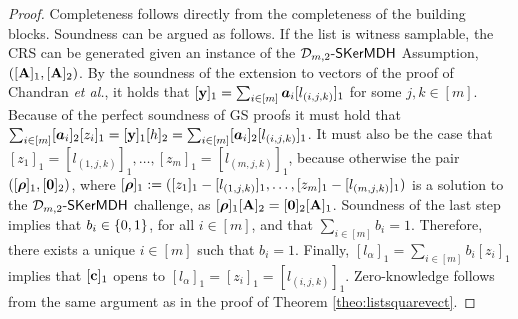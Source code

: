 \begin{proof} Completeness follows directly from the completeness of the 
building blocks.  Soundness can be argued as follows. If the list is witness samplable, the CRS can be generated given an instance of the $\mathcal{D}_{m,2}\mbox{-}\mathsf{SKerMDH}$ Assumption, $([\mathbf{{A}}]_1, [\mathbf{{A}}]_2)$. By the soundness of the extension to vectors of the proof of Chandran \textit{et al.}, it holds that $[\mathbf{y}]_1 = \sum_{i\in[m]}{\boldsymbol a}_i[l_{(i,j,k)}]_1$ for some $j,k\in[m]$.
Because of the perfect soundness of GS proofs it must hold that $\sum_{i\in[m]}[{\boldsymbol a}_i]_2[z_i]_1=[\mathbf{y}]_1[h]_2=\sum_{i\in[m]}[{\boldsymbol a}_i]_2[l_{(i,j,k)}]_1$. It must also be the case that $[z_1]_1=[l_{(1,j,k)}]_1,\ldots,[z_m]_1=[l_{(m,j,k)}]_1$, because otherwise the pair $([{\boldsymbol \rho}]_1,[{\boldsymbol 0}]_2)$, where 
$[{\boldsymbol \rho}]_1:=([z_1]_1-[l_{(1,j,k)}]_1,\ldots,[z_m]_1-[l_{(m,j,k)}]_1)$ is a solution to the $\mathcal{D}_{m,2}\mbox{-}\mathsf{SKerMDH}$ challenge, as $[{\boldsymbol \rho}]_1[\mathbf{{A}}]_2=[{\boldsymbol 0}]_2[\mathbf{{A}}]_1$. Soundness of the last step implies that $b_i\in\{0,1\}$, for all $i\in[m]$, and that $\sum_{i\in[m]} b_i=1$. Therefore, there exists a unique $i\in[m]$ such that $b_i=1$. Finally, $[l_{\alpha}]_1=\sum_{i\in[m]}b_i[z_i]_1$ implies that $[\mathbf{c}]_1$ opens to $[l_{\alpha}]_1=[z_i]_1=[l_{(i,j,k)}]_1$.
Zero-knowledge follows from the same argument as in the proof of Theorem \ref{theo:listsquarevect}.
\end{proof} 

